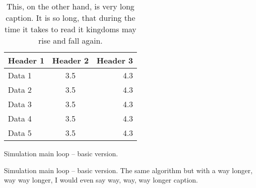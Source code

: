 \begin{table}
  \caption{This, on the other hand, is very long caption. It is so long, that
    during the time it takes to read it kingdoms may rise and fall again.}
  \centering
  \begin{tabular}{lcr}
    \toprule
    Header 1 & Header 2 & Header 3 \\
    \midrule
    Data 1   & 3.5      & 4.3      \\
    Data 2   & 3.5      & 4.3      \\
    Data 3   & 3.5      & 4.3      \\
    Data 4   & 3.5      & 4.3      \\
    Data 5   & 3.5      & 4.3      \\
    \bottomrule
  \end{tabular}
\end{table}

\begin{algorithm}[H]
  \centering
  \begin{algorithmic}

    \ENDFOR

    \ENDFOR
    \ENDFOR
  \end{algorithmic}
  \caption{Simulation main loop -- basic version.}
  \label{alg:loop_basic}
\end{algorithm}

\begin{algorithm}[H]
  \centering
  \begin{algorithmic}

    \ENDFOR

    \ENDFOR
    \ENDFOR
  \end{algorithmic}
  \caption{Simulation main loop -- basic version. The same algorithm but with
    a way longer, way way longer, I would even say way, way, way longer
    caption.}
  \label{alg:loop_basic2}
\end{algorithm}

